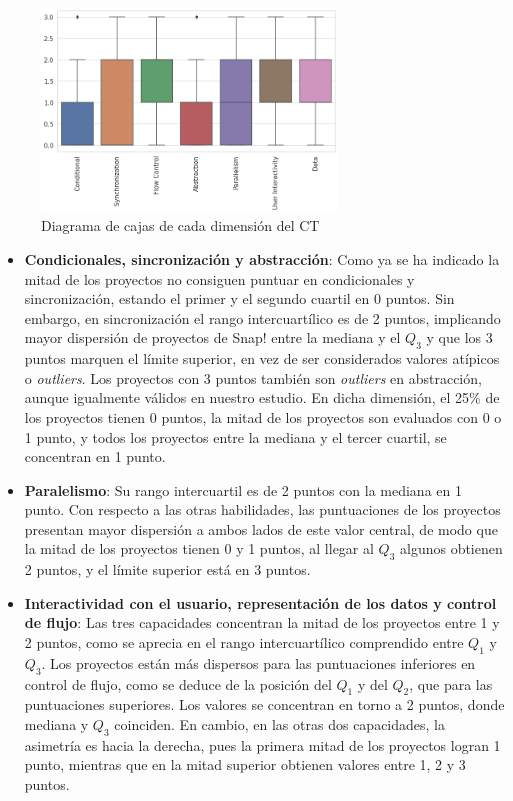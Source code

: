 \documentclass[a4paper, 12pt]{book}
\begin{document}
\begin{figure}[H]
    \centering
    \includegraphics[width=0.7\textwidth]{img/diag_cajas_Snap.png}
    \caption{Diagrama de cajas de cada dimensión del CT}
    \label{fig:cajas_Snap}
\end{figure}

\begin{itemize}
    \item \textbf{Condicionales, sincronización y abstracción}: Como ya se ha indicado la mitad de los proyectos no consiguen puntuar en condicionales y sincronización, estando el primer y el segundo cuartil en 0 puntos. Sin embargo, en sincronización el rango intercuartílico es de 2 puntos, implicando mayor dispersión de proyectos de Snap! entre la mediana y el $Q_3$ y que los 3 puntos marquen el límite superior, en vez de ser considerados valores atípicos o \emph{outliers}. Los proyectos con 3 puntos también son \emph{outliers} en abstracción, aunque igualmente válidos en nuestro estudio. En dicha dimensión, el 25\% de los proyectos tienen 0 puntos, la mitad de los proyectos son evaluados con 0 o 1 punto, y todos los proyectos entre la mediana y el tercer cuartil, se concentran en 1 punto. %
    \item \textbf{Paralelismo}: Su rango intercuartil es de 2 puntos con la mediana en 1 punto. Con respecto a las otras habilidades, las puntuaciones de los proyectos presentan mayor dispersión a ambos lados de este valor central, de modo que la mitad de los proyectos tienen 0 y 1 puntos, al llegar al $Q_3$ algunos obtienen 2 puntos, y el límite superior está en 3 puntos.
    \item \textbf{Interactividad con el usuario, representación de los datos y control de flujo}: Las tres capacidades concentran la mitad de los proyectos entre 1 y 2 puntos, como se aprecia en el rango intercuartílico comprendido entre $Q_1$ y $Q_3$. Los proyectos están más dispersos para las puntuaciones inferiores en control de flujo, como se deduce de la posición del $Q_1$ y del $Q_2$, que para las puntuaciones superiores. Los valores se concentran en torno a 2 puntos, donde mediana y $Q_3$ coinciden. En cambio, en las otras dos capacidades, la asimetría es hacia la derecha, pues la primera mitad de los proyectos logran 1 punto, mientras que en la mitad superior obtienen valores entre 1, 2 y 3 puntos.
\end{itemize}
\end{document}
